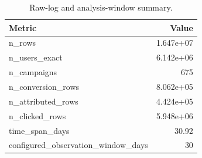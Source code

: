 \begin{table}
\caption{Raw-log and analysis-window summary.}
\label{tab:app_exp2_dataset_summary}
\begin{tabular}{lr}
\toprule
Metric & Value \\
\midrule
n\_rows & 1.647e+07 \\
n\_users\_exact & 6.142e+06 \\
n\_campaigns & 675 \\
n\_conversion\_rows & 8.062e+05 \\
n\_attributed\_rows & 4.424e+05 \\
n\_clicked\_rows & 5.948e+06 \\
time\_span\_days & 30.92 \\
configured\_observation\_window\_days & 30 \\
\bottomrule
\end{tabular}
\end{table}
